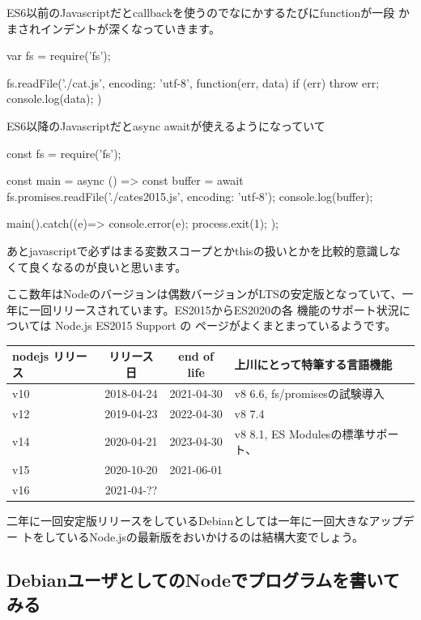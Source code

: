 \documentclass[mingoth,a4paper]{jsarticle}
\begin{document}
ES6以前のJavascriptだとcallbackを使うのでなにかするたびにfunctionが一段
かまされインデントが深くなっていきます。

\begin{commandline}
var fs = require('fs');

fs.readFile('./cat.js', {encoding: 'utf-8'}, function(err, data) {
    if (err) throw err;
    console.log(data);
})
\end{commandline}

ES6以降のJavascriptだとasync awaitが使えるようになっていて

\begin{commandline}
const fs  = require('fs');

const main = async () => {
    const buffer = await fs.promises.readFile('./cates2015.js',
					      {encoding: 'utf-8'});
    console.log(buffer);
}

main().catch((e)=>{
    console.error(e);
    process.exit(1);
});

\end{commandline}

あとjavascriptで必ずはまる変数スコープとかthisの扱いとかを比較的意識しな
くて良くなるのが良いと思います。

ここ数年はNodeのバージョンは偶数バージョンがLTSの安定版となっていて、一
年に一回リリースされています\cite{nodejsreleases}。ES2015からES2020の各
機能のサポート状況については Node.js ES2015 Support \cite{node-green}の
ページがよくまとまっているようです。

\begin{tabular}{|l|c|c|l|}
\hline
nodejs リリース & リリース日 & end of life & 上川にとって特筆する言語機能\\
\hline
v10 & 2018-04-24 & 2021-04-30 & v8 6.6, fs/promisesの試験導入 \\
v12 & 2019-04-23 & 2022-04-30 & v8 7.4\\
v14 & 2020-04-21 & 2023-04-30 & v8 8.1, ES Modulesの標準サポート、 \\
v15 & 2020-10-20 & 2021-06-01 &  \\
v16 & 2021-04-?? &            &  \\
\hline
\end{tabular}

二年に一回安定版リリースをしているDebianとしては一年に一回大きなアップデー
トをしているNode.jsの最新版をおいかけるのは結構大変でしょう。

\subsection{DebianユーザとしてのNodeでプログラムを書いてみる}
\end{document}
